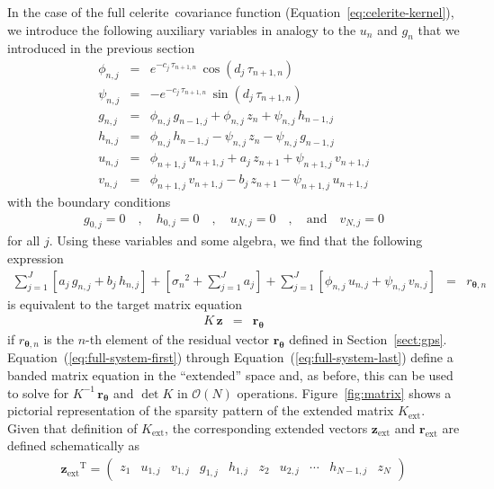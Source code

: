 \documentclass[manuscript, letterpaper]{aastex6}
\newcommand{\project}[1]{\textsf{#1}}
\newcommand{\celerite}{\project{celerite}}
\newcommand{\figureref}[1]{\ref{fig:#1}}
\newcommand{\Figure}[1]{Figure~\figureref{#1}}
\renewcommand{\eqref}[1]{\ref{eq:#1}}
\newcommand{\Eq}[1]{Equation~(\eqref{#1})}
\newcommand{\eq}[1]{\Eq{#1}}
\newcommand{\eqalt}[1]{Equation~\eqref{#1}}
\newcommand{\eqlabel}[1]{\label{eq:#1}}
\newcommand{\sectionname}{Section}
\newcommand{\sectref}[1]{\ref{sect:#1}}
\newcommand{\Sect}[1]{\sectionname~\sectref{#1}}
\newcommand{\sect}[1]{\Sect{#1}}
\newcommand{\T}{\ensuremath{\mathrm{T}}}
\newcommand{\bvec}[1]{{\ensuremath{\boldsymbol{#1}}}}
\begin{document}
In the case of the full \celerite\ covariance function
(\eqalt{celerite-kernel}), we introduce the following auxiliary variables in
analogy to the $u_n$ and $g_n$ that we introduced in the previous section
\begin{eqnarray}\eqlabel{full-system-first}
\phi_{n,j} &=& e^{-c_j\,\tau_{n+1,n}}\,\cos\left(d_j\,\tau_{n+1,n}\right)\\
\psi_{n,j} &=& -e^{-c_j\,\tau_{n+1,n}}\,\sin\left(d_j\,\tau_{n+1,n}\right)\\
g_{n,j} &=& \phi_{n,j}\,g_{n-1,j} + \phi_{n,j}\,z_n + \psi_{n,j}\,h_{n-1,j}\\
h_{n,j} &=& \phi_{n,j}\,h_{n-1,j} - \psi_{n,j}\,z_n - \psi_{n,j}\,g_{n-1,j}\\
u_{n,j} &=& \phi_{n+1,j}\,u_{n+1,j} + a_j\,z_{n+1} + \psi_{n+1,j}\,v_{n+1,j}\\
v_{n,j} &=& \phi_{n+1,j}\,v_{n+1,j} - b_j\,z_{n+1} - \psi_{n+1,j}\,u_{n+1,j}
\end{eqnarray}
with the boundary conditions
\begin{eqnarray}
    g_{0,j} = 0 \quad, \quad
    h_{0,j} = 0 \quad, \quad
    u_{N,j} = 0 \quad, \quad\mathrm{and}\quad
    v_{N,j} = 0
\end{eqnarray}
for all $j$.
Using these variables and some algebra, we find that the following expression
\begin{eqnarray}\eqlabel{full-system-last}
\sum_{j=1}^J \left[a_j\,g_{n,j}+b_j\,h_{n,j}\right]
+ \left[{\sigma_n}^2+\sum_{j=1}^J a_j\right]
+ \sum_{j=1}^J \left[\phi_{n,j}\,u_{n,j}+\psi_{n,j}\,v_{n,j}\right]
    &=& r_{\bvec{\theta},n}
\end{eqnarray}
is equivalent to the target matrix equation
\begin{eqnarray}
K\,\bvec{z} &=& \bvec{r}_\bvec{\theta}
\end{eqnarray}
if $r_{\bvec{\theta},n}$ is the $n$-th element of the residual vector
$\bvec{r}_\bvec{\theta}$ defined in \sect{gps}.
\eq{full-system-first} through \eq{full-system-last} define a banded matrix
equation in the ``extended'' space and, as before, this can be used to solve
for $K^{-1}\,\bvec{r}_\bvec{\theta}$ and $\det K$ in $\mathcal{O}(N)$
operations.
\Figure{matrix} shows a pictorial representation of the sparsity pattern of
the extended matrix $K_\mathrm{ext}$.
Given that definition of $K_\mathrm{ext}$, the corresponding extended vectors
$\bvec{z}_\mathrm{ext}$ and $\bvec{r}_\mathrm{ext}$ are defined schematically
as
\begin{eqnarray}
{\bvec{z}_\mathrm{ext}} ^\T =
\left(\begin{array}{cccccccccc}
    z_1 & u_{1,j} & v_{1,j} & g_{1,j} & h_{1,j} & z_2 & u_{2,j} & \cdots &
    h_{N-1,j} & z_N
\end{array}\right)
\end{eqnarray}
\end{document}
